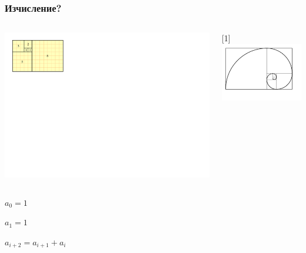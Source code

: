 \documentclass{beamer}
\begin{document}
\begin{frame}[fragile]
\frametitle{Изчисление?}


\begin{columns}[c]
  \begin{column}{0.5\textwidth}

    \includegraphics[width=19cm]{images/fib_tiling}
  \end{column}
  \begin{column}{0.5\textwidth}
  \vspace*{250pt}
    \begin{turn}{90}
    \scalebox{1}[1]{\includegraphics[width=7cm]{images/fib_spiral}}      
    \end{turn}
  \end{column}
\end{columns}


\vspace*{-300pt}
  
$a_0=1$


$a_1=1$


$a_{i+2} = a_{i+1} + a_i $



\end{frame}
\end{document}
